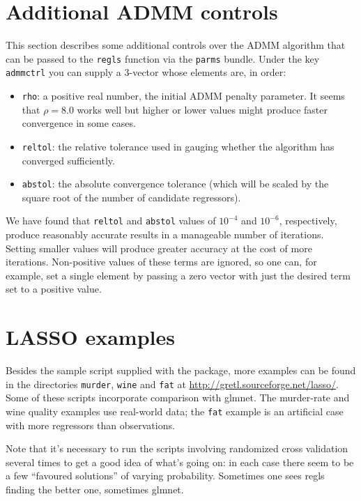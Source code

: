 \documentclass{article}
\begin{document}
\section{Additional ADMM controls}
\label{sec:add-controls}

This section describes some additional controls over the ADMM
algorithm that can be passed to the \texttt{regls} function via the
\texttt{parms} bundle. Under the key \texttt{admmctrl} you can supply
a 3-vector whose elements are, in order:
\begin{itemize}
\item \texttt{rho}: a positive real number, the initial ADMM penalty
  parameter. It seems that $\rho = 8.0$ works well but higher or lower
  values might produce faster convergence in some cases.
\item \texttt{reltol}: the relative tolerance used in gauging whether
  the algorithm has converged sufficiently.
\item \texttt{abstol}: the absolute convergence tolerance (which will
  be scaled by the square root of the number of candidate regressors).
\end{itemize}
We have found that \texttt{reltol} and \texttt{abstol} values of
$10^{-4}$ and $10^{-6}$, respectively, produce reasonably accurate
results in a manageable number of iterations. Setting smaller values
will produce greater accuracy at the cost of more iterations.
Non-positive values of these terms are ignored, so one can, for
example, set a single element by passing a zero vector with just the
desired term set to a positive value.

\section{LASSO examples}
\label{sec:examples}

Besides the sample script supplied with the package, more examples can
be found in the directories \texttt{murder}, \texttt{wine} and
\texttt{fat} at \url{http://gretl.sourceforge.net/lasso/}.  Some of
these scripts incorporate comparison with \textsf{glmnet}.  The
murder-rate and wine quality examples use real-world data; the
\texttt{fat} example is an artificial case with more regressors than
observations.

Note that it's necessary to run the scripts involving randomized cross
validation several times to get a good idea of what's going on: in
each case there seem to be a few ``favoured solutions'' of varying
probability. Sometimes one sees \textsf{regls} finding the better one,
sometimes \textsf{glmnet}.
\end{document}
